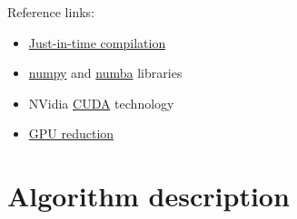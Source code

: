 \documentclass[letterpaper, 16pt]{article}
\newcommand{\vbreak}{\vspace{4mm}}
\begin{document}
\vbreak

Reference links:
\begin{itemize}
    \item \href{https://en.wikipedia.org/wiki/Just-in-time_compilation}{Just-in-time compilation}
    \item \href{https://numpy.org/}{numpy} and \href{https://numba.pydata.org/}{numba} libraries
    \item NVidia \href{https://docs.nvidia.com/cuda/}{CUDA} technology
    \item \href{https://developer.download.nvidia.com/assets/cuda/files/reduction.pdf}{GPU reduction}
\end{itemize}

\newpage
\section{Algorithm description}
\end{document}
